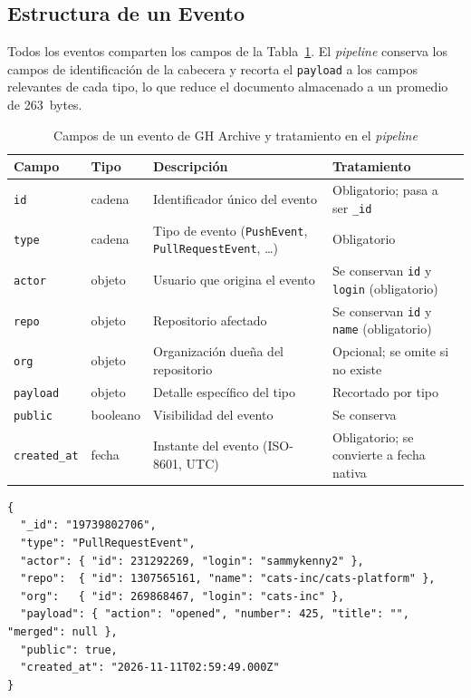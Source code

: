 \subsection{Estructura de un Evento}

Todos los eventos comparten los campos de la Tabla~\ref{tab:campos}. El \textit{pipeline} conserva los campos de identificación de la cabecera y recorta el \texttt{payload} a los campos relevantes de cada tipo, lo que reduce el documento almacenado a un promedio de 263~bytes.

\begin{table}[H]
\centering
\caption{Campos de un evento de GH Archive y tratamiento en el \textit{pipeline}}
\label{tab:campos}
\vspace{0.2cm}
\small
\begin{tabular}{@{}llp{5.3cm}p{4.6cm}@{}}
\toprule
\textbf{Campo} & \textbf{Tipo} & \textbf{Descripción} & \textbf{Tratamiento} \\
\midrule
\texttt{id}          & cadena  & Identificador único del evento & Obligatorio; pasa a ser \texttt{\_id} \\
\texttt{type}        & cadena  & Tipo de evento (\texttt{PushEvent}, \texttt{PullRequestEvent}, \ldots) & Obligatorio \\
\texttt{actor}       & objeto  & Usuario que origina el evento & Se conservan \texttt{id} y \texttt{login} (obligatorio) \\
\texttt{repo}        & objeto  & Repositorio afectado & Se conservan \texttt{id} y \texttt{name} (obligatorio) \\
\texttt{org}         & objeto  & Organización dueña del repositorio & Opcional; se omite si no existe \\
\texttt{payload}     & objeto  & Detalle específico del tipo & Recortado por tipo \\
\texttt{public}      & booleano & Visibilidad del evento & Se conserva \\
\texttt{created\_at} & fecha   & Instante del evento (ISO-8601, UTC) & Obligatorio; se convierte a fecha nativa \\
\bottomrule
\end{tabular}
\end{table}

\begin{lstlisting}[style=plano]
{
  "_id": "19739802706",
  "type": "PullRequestEvent",
  "actor": { "id": 231292269, "login": "sammykenny2" },
  "repo":  { "id": 1307565161, "name": "cats-inc/cats-platform" },
  "org":   { "id": 269868467, "login": "cats-inc" },
  "payload": { "action": "opened", "number": 425, "title": "", "merged": null },
  "public": true,
  "created_at": "2026-11-11T02:59:49.000Z"
}
\end{lstlisting}

